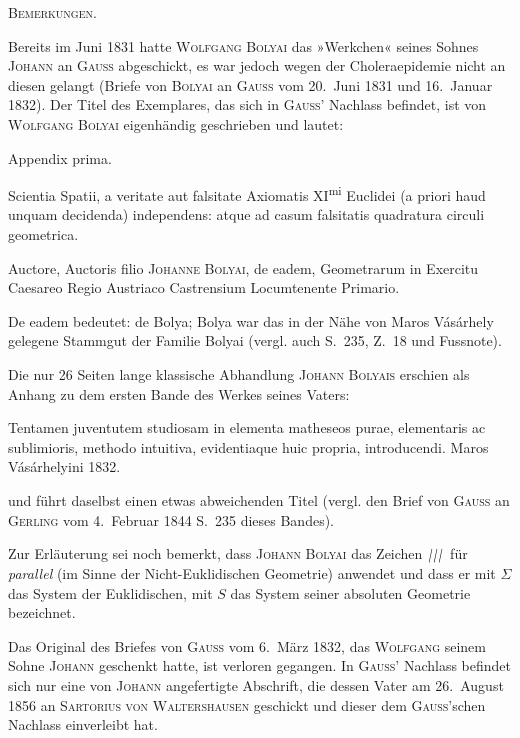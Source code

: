 %
\begin{center}\textsc{Bemerkungen.}\end{center}
\begingroup\small
Bereits im Juni 1831 hatte \textsc{Wolfgang Bolyai} das »Werkchen« seines Sohnes \textsc{Johann} an \textsc{Gauss} abgeschickt, es war jedoch wegen der Choleraepidemie nicht an diesen gelangt (Briefe von \textsc{Bolyai} an \textsc{Gauss} vom 20.~Juni 1831 und 16.~Januar 1832). Der Titel des Exemplares, das sich in \textsc{Gauss}' Nachlass befindet, ist von \textsc{Wolfgang Bolyai} eigenhändig geschrieben und lautet:
\begin{center}Appendix prima.\end{center}
\noindent Scientia Spatii, a veritate aut falsitate Axiomatis XI\textsuperscript{mi} Euclidei (a priori haud unquam decidenda) independens: atque ad casum falsitatis quadratura circuli geometrica.

Auctore, Auctoris filio \textsc{Johanne Bolyai}, de eadem, Geometrarum in Exercitu Caesareo Regio Austriaco Castrensium Locumtenente Primario.

De eadem bedeutet: de Bolya; Bolya war das in der Nähe von Maros Vásárhely gelegene Stammgut der Familie Bolyai (vergl. auch S.~235, Z.~18 und Fussnote).

Die nur 26 Seiten lange klassische Abhandlung \textsc{Johann Bolyais} erschien als Anhang zu dem ersten Bande des Werkes seines Vaters:

Tentamen juventutem studiosam in elementa matheseos purae, elementaris ac sublimioris, methodo intuitiva, evidentiaque huic propria, introducendi. Maros Vásárhelyini 1832.

\noindent und führt daselbst einen etwas abweichenden Titel (vergl. den Brief von \textsc{Gauss} an \textsc{Gerling} vom 4.~Februar 1844 S.~235 dieses Bandes).

Zur Erläuterung sei noch bemerkt, dass \textsc{Johann Bolyai} das Zeichen $\TripleParallel$ für \emph{parallel} (im Sinne der Nicht-Euklidischen Geometrie) anwendet und dass er mit $\Sigma$ das System der Euklidischen, mit $S$ das System seiner absoluten Geometrie bezeichnet.

Das Original des Briefes von \textsc{Gauss} vom 6.~März 1832, das \textsc{Wolfgang} seinem Sohne \textsc{Johann} geschenkt hatte, ist verloren gegangen. In \textsc{Gauss}' Nachlass befindet sich nur eine von \textsc{Johann} angefertigte Abschrift, die dessen Vater am 26.~August 1856 an \textsc{Sartorius von Waltershausen} geschickt und dieser dem \textsc{Gauss}'schen Nachlass einverleibt hat.

